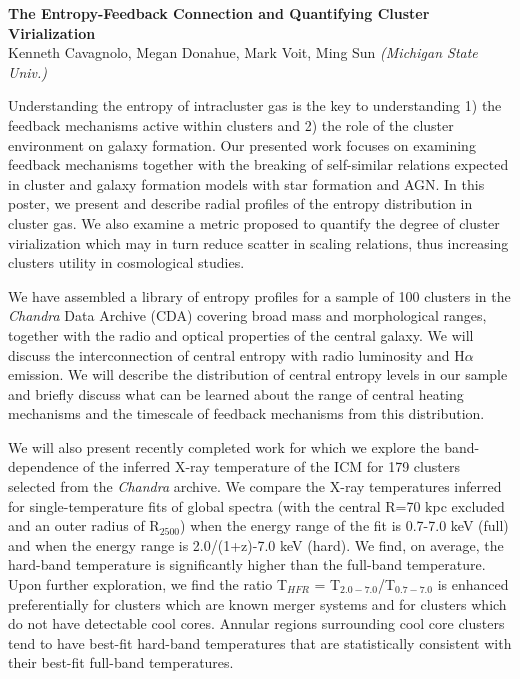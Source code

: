 \documentclass[12pt]{plan}
\begin{document}
\begin{center}
\vspace{1.5mm}
{\bf The Entropy-Feedback Connection and Quantifying Cluster Virialization}\\
Kenneth Cavagnolo, Megan Donahue, Mark Voit, Ming Sun \textit{(Michigan State Univ.)}\\
\vspace{1.5mm}
\end{center}

Understanding the entropy of intracluster gas is the key to
understanding 1) the feedback mechanisms active within clusters and 2)
the role of the cluster environment on galaxy formation. Our presented
work focuses on examining feedback mechanisms together with the
breaking of self-similar relations expected in cluster and galaxy
formation models with star formation and AGN. In this poster, we
present and describe radial profiles of the entropy distribution in
cluster gas. We also examine a metric proposed to quantify the degree
of cluster virialization which may in turn reduce scatter in scaling
relations, thus increasing clusters utility in cosmological studies.

We have assembled a library of entropy profiles for a sample of
100 clusters in the \textit{Chandra} Data Archive (CDA) covering broad
mass and morphological ranges, together with the radio and optical
properties of the central galaxy. We will discuss the interconnection
of central entropy with radio luminosity and H$\alpha$ emission. We
will describe the distribution of central entropy levels in our sample
and briefly discuss what can be learned about the range of central
heating mechanisms and the timescale of feedback mechanisms from this
distribution.

We will also present recently completed work for which we explore the
band-dependence of the inferred X-ray temperature of the ICM for 179
clusters selected from the \textit{Chandra} archive. We compare the X-ray temperatures
inferred for single-temperature fits of global spectra (with the
central R=70 kpc excluded and an outer radius of R$_{2500}$) when the
energy range of the fit is 0.7-7.0 keV (full) and when the energy range is
2.0/(1+z)-7.0 keV (hard). We find, on average, the hard-band
temperature is significantly higher than the full-band
temperature. Upon further exploration, we find the ratio T$_{HFR}$ =
T$_{2.0-7.0}$/T$_{0.7-7.0}$ is enhanced preferentially for clusters
which are known merger systems and for clusters which do not have
detectable cool cores. Annular regions surrounding cool core clusters
tend to have best-fit hard-band temperatures that are statistically
consistent with their best-fit full-band temperatures. 
\end{document}
